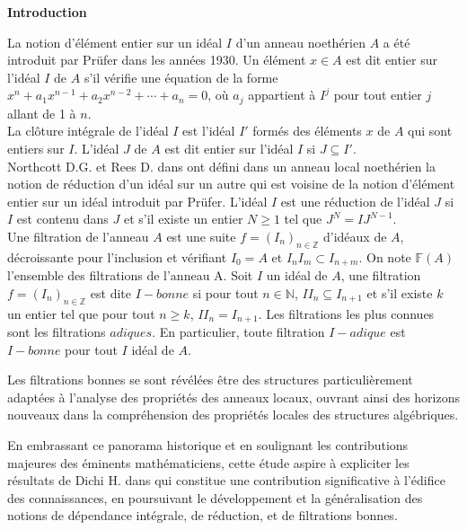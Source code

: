 \newpage
\tableofcontents
\renewcommand{\contentsname}{Table des matières}
\thispagestyle{empty}

\newpage

\setcounter{page}{0} 
\thispagestyle{empty}
\begin{center}
	\LARGE{\textbf{Introduction}}
\end{center}
\vspace{1cm}

La notion d'élément entier sur un idéal $I$ d'un anneau noethérien $A$ a été introduit par Prüfer \cite{Pr} dans les années 1930. Un élément $x \in A $ est dit entier sur l'idéal $I$ de $A$ s'il vérifie une équation de la forme $x^n + a_1 x^{n-1} +a_2 x^{n-2}+ \cdots + a_n = 0$, où $a_j$ appartient à $I^j$ pour tout entier $j$ allant de 1 à $n$.\\ 
La clôture intégrale de l'idéal $I$ est l'idéal $I'$ formés des éléments $x$ de $A$ qui sont entiers sur $I$. L'idéal $J$ de $A$ est dit entier sur l'idéal $I$ si $J \subseteq I'$.\\ Northcott D.G. et Rees D. dans \cite{No} ont défini dans un anneau local noethérien la notion de réduction d'un idéal sur un autre qui est voisine de la notion d'élément entier sur un idéal introduit par Prüfer. L'idéal $I$ est une réduction de l'idéal $J$ si $I$ est contenu dans $J$ et s'il existe un entier $N \geqslant 1$ tel que $J^N = IJ^{N-1}$.\\
Une filtration de l'anneau $A$ est une suite $f=(I_n)_{n \in \mathbb{Z}}$ d'idéaux de $A$, décroissante pour l'inclusion et vérifiant $I_0 = A$ et $I_n I_m \subset I_{n+m}$. On note $\mathbb{F}(A)$ l'ensemble des filtrations de l'anneau A. Soit $I$ un idéal de $A$, une filtration $f=(I_n)_{n \in \mathbb{Z}}$ est dite $I-bonne$ si pour tout $n \in \mathbb{N}$, $II_n \subseteq I_{n+1}$ et s'il existe $k$ un entier tel que pour tout $n \geqslant k$, $II_n = I_{n+1}$. Les filtrations les plus connues sont les filtrations $adiques$. En particulier, toute filtration $I-adique$ est $I-bonne$ pour tout $I$ idéal de $A$.

Les filtrations bonnes se sont révélées être des structures particulièrement adaptées à l'analyse des propriétés des anneaux locaux, ouvrant ainsi des horizons nouveaux dans la compréhension des propriétés locales des structures algébriques.

En embrassant ce panorama historique et en soulignant les contributions majeures des éminents mathématiciens, cette étude aspire à expliciter les résultats de Dichi H. dans \cite{Di2} qui constitue une contribution significative à l'édifice des connaissances, en poursuivant le développement et la généralisation des notions de dépendance intégrale, de réduction, et de filtrations bonnes.

